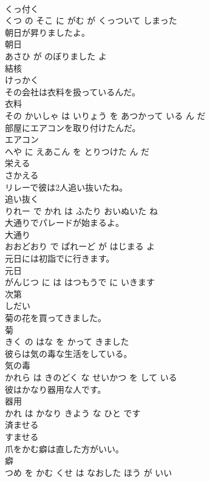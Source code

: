 \documentclass[8pt]{extreport}
\begin{document}
\begin{CJK}{UTF8}{min}
\\	くっ付く 
\\	くつ の そこ に がむ が くっついて しまった			
\\	朝日が昇りましたよ。	
\\	朝日 
\\	あさひ が のぼりました よ			
\\	結核	
\\	けっかく			
\\	その会社は衣料を扱っているんだ。	
\\	衣料 
\\	その かいしゃ は いりょう を あつかって いる ん だ			
\\	部屋にエアコンを取り付けたんだ。	
\\	エアコン 
\\	へや に えあこん を とりつけた ん だ			
\\	栄える	
\\	さかえる			
\\	リレーで彼は2人追い抜いたね。	
\\	追い抜く 
\\	りれー で かれ は ふたり おいぬいた ね			
\\	大通りでパレードが始まるよ。	
\\	大通り 
\\	おおどおり で ぱれーど が はじまる よ			
\\	元日には初詣でに行きます。	
\\	元日 
\\	がんじつ に は はつもうで に いきます			
\\	次第	
\\	しだい			
\\	菊の花を買ってきました。	
\\	菊 
\\	きく の はな を かって きました			
\\	彼らは気の毒な生活をしている。	
\\	気の毒 
\\	かれら は きのどく な せいかつ を して いる			
\\	彼はかなり器用な人です。	
\\	器用 
\\	かれ は かなり きよう な ひと です			
\\	済ませる	
\\	すませる			
\\	爪をかむ癖は直した方がいい。	
\\	癖 
\\	つめ を かむ くせ は なおした ほう が いい			

\end{CJK}
\end{document}
